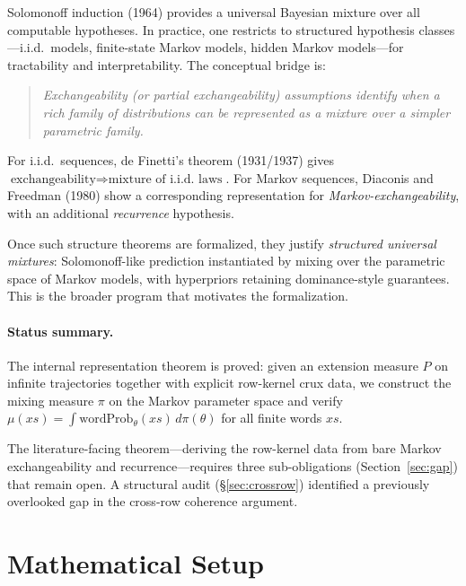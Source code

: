 \documentclass[11pt]{article}
\theoremstyle{definition}
\begin{document}
Solomonoff induction (1964) provides a universal Bayesian mixture over all
computable hypotheses.  In practice, one restricts to structured hypothesis
classes---i.i.d.\ models, finite-state Markov models, hidden Markov models---for
tractability and interpretability.  The conceptual bridge is:

\begin{quote}
\emph{Exchangeability (or partial exchangeability) assumptions identify when a
rich family of distributions can be represented as a mixture over a simpler
parametric family.}
\end{quote}

For i.i.d.\ sequences, de Finetti's theorem (1931/1937) gives
$\text{exchangeability} \Rightarrow \text{mixture of i.i.d.\ laws}$.
For Markov sequences, Diaconis and Freedman (1980) show a corresponding
representation for \emph{Markov-exchangeability}, with an additional
\emph{recurrence} hypothesis.

Once such structure theorems are formalized, they justify \emph{structured
universal mixtures}: Solomonoff-like prediction instantiated by mixing over
the parametric space of Markov models, with hyperpriors retaining
dominance-style guarantees.  This is the broader program that motivates the
formalization.

\paragraph{Status summary.}
The internal representation theorem is proved: given an extension measure $P$
on infinite trajectories together with explicit row-kernel crux data, we
construct the mixing measure $\pi$ on the Markov parameter space and verify
$\mu(xs) = \int \mathrm{wordProb}_\theta(xs)\, d\pi(\theta)$ for all finite
words $xs$.

The literature-facing theorem---deriving the row-kernel data from bare
Markov exchangeability and recurrence---requires three sub-obligations
(Section~\ref{sec:gap}) that remain open.  A structural audit
(\S\ref{sec:crossrow}) identified a previously overlooked gap in the
cross-row coherence argument.

\section{Mathematical Setup}
\label{sec:setup}
\end{document}
